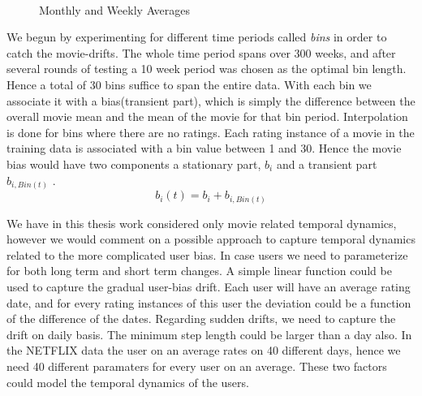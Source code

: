\begin{figure}[h!]
\\

\label{fig:MonthlyWeeklyAverages}
\caption{Monthly and Weekly Averages}
\end{figure}

We begun by experimenting for different time periods called \emph{bins} in order
to catch the movie-drifts.  The whole time period spans over 300 weeks, and
after several rounds of testing a 10 week period was chosen as the optimal bin
length. Hence a total of 30 bins suffice to span the entire data. With each bin
we associate it with a bias(transient part), which is simply the difference
between the overall movie mean and the mean of the movie for that bin period.
Interpolation is done for bins where there are no ratings. Each rating instance
of a movie in the training data is associated with a bin value between 1 and 30.
Hence the movie bias would have two components a stationary part, $b_{i}$ and a
transient part $b_{i,Bin(t)}$ \cite{Koren:2010:CFT:1721654.1721677}. \\

\begin{equation} 
 b_{i}(t)=b_{i}+b_{i,Bin(t)}
\end{equation}

We have in this thesis work considered only movie related temporal dynamics,
however we would comment on a possible approach to capture temporal dynamics
related to the more complicated user bias. In case users we need to parameterize
for both long term and short term changes. A simple linear function could be
used to capture the gradual user-bias drift. Each user will have an average
rating date, and for every rating instances of this user the deviation could be
a function of the difference of the dates. Regarding sudden drifts, we need to
capture the drift on daily basis. The minimum step length could be larger than a
day also. In the NETFLIX data the user on an average rates on 40 different days,
hence we need 40 different paramaters for every user on an average. These two
factors could model the temporal dynamics of the users.  


